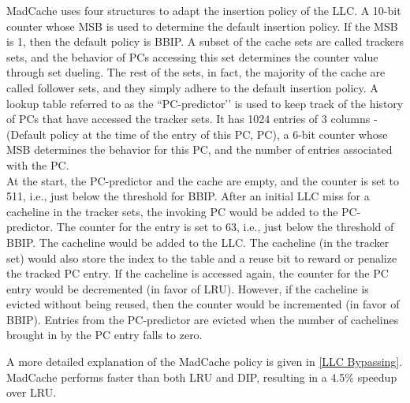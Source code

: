 \documentclass[11pt, swedish, openany]{book}
\begin{document}
MadCache uses four structures to adapt the insertion policy of the LLC.
A 10-bit counter whose MSB is used to determine the default insertion policy. If the MSB is 1, then the default policy is BBIP.
A subset of the cache sets are called trackers sets, and the behavior of PCs accessing this set determines the counter value through set dueling.
The rest of the sets, in fact, the majority of the cache are called follower sets, and they simply adhere to the default insertion policy.
A lookup table referred to as the ``PC-predictor’’ is used to keep track of the history of PCs that have accessed the tracker sets. It has 1024 entries of 3 columns - (Default policy at the time of the entry of this PC, PC), a 6-bit counter whose MSB determines the behavior for this PC, and the number of entries associated with the PC. \\

At the start, the PC-predictor and the cache are empty, and the counter is set to 511, i.e., just below the threshold for BBIP.
After an initial LLC miss for a cacheline in the tracker sets, the invoking PC would be added to the PC-predictor. The counter for the entry is set to 63, i.e., just below the threshold of BBIP. The cacheline would be added to the LLC. The cacheline (in the tracker set) would also store the index to the table and a reuse bit to reward or penalize the tracked PC entry.
If the cacheline is accessed again, the counter for the PC entry would be decremented (in favor of LRU). However, if the cacheline is evicted without being reused, then the counter would be incremented (in favor of BBIP).
Entries from the PC-predictor are evicted when the number of cachelines brought in by the PC entry falls to zero.

A more detailed explanation of the MadCache policy is given in \autoref{LLC Bypassing}. \\

MadCache performs faster than both LRU and DIP, resulting in a 4.5\% speedup over LRU.
\end{document}

